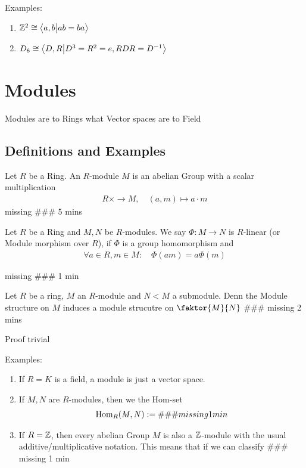 Examples:
\begin{enumerate}
	\item $\mathbb{Z}^2 \cong \left<a,b \big\vert ab = ba\right>$
	\item $D_6 \cong \left<D,R \big\vert D^3 = R^2 = e, RDR = D^{-1}\right>$
\end{enumerate}


\section{Modules}
\begin{center}
	Modules are to Rings what Vector spaces are to Field
\end{center}
\subsection{Definitions and Examples}
\begin{definition}[]
	Let $R$ be a Ring. An $R$-module $M$ is an abelian Group with a scalar multiplication
	\begin{align*}
		R \times \to M, \quad (a,m) \mapsto a \cdot m
	\end{align*} 
	missing \#\#\# 5 mins
\end{definition}


\begin{definition}[]
	Let $R$ be a Ring and $M,N$ be $R$-modules. We say $\Phi: M \to N$ is $R$-linear (or Module morphism over $R$), if $\Phi$ is a group homomorphism and 
	\begin{align*}
		\forall a \in R, m \in M: \quad \Phi(am) = a \Phi(m)
	\end{align*}
\end{definition}

\begin{definition}[Submodule]
missing \#\#\# 1 min
\end{definition}


\begin{lemma}[]
	Let $R$ be a ring, $M$ an $R$-module and $N < M$ a submodule. Denn the Module structure on $M$ induces a module strucutre on $\faktor{M}{N}$ \#\#\# missing 2 mins
\end{lemma}
Proof trivial

Examples: 
\begin{enumerate}
	\item If $R = K$ is a field, a module is just a vector space.
	\item If $M,N$ are $R$-modules, then we the Hom-set
		\begin{align*}
			\operatorname{Hom}_R(M,N) := \#\#\# missing 1 min			
		\end{align*}
	\item If $R = \mathbb{Z}$, then every abelian Group $M$ is also a $\mathbb{Z}$-module with the usual additive/multiplicative notation. This means that if we can classify \#\#\# missing 1 min
\end{enumerate}


